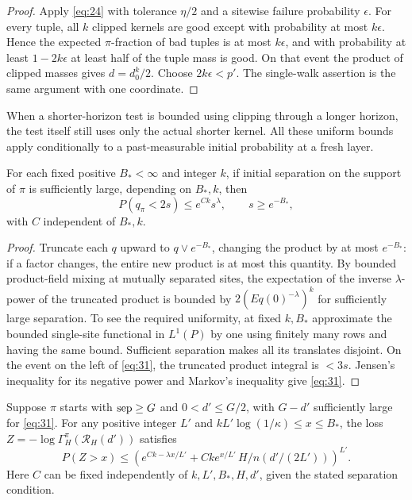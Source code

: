 \begin{proof}
Apply \eqref{eq:24} with tolerance \(\eta/2\) and a sitewise failure
probability \(\epsilon\). For every tuple, all \(k\) clipped kernels
are good except with probability at most \(k\epsilon\). Hence the
expected \(\pi\)-fraction of bad tuples is at most \(k\epsilon\), and
with probability at least \(1-2k\epsilon\) at least half of the tuple
mass is good. On that event the product of clipped masses gives
\(d=d_0^k/2\). Choose \(2k\epsilon<p'\). The single-walk assertion is
the same argument with one coordinate.
\end{proof}

When a shorter-horizon test is bounded using clipping through a longer
horizon, the test itself still uses only the actual shorter kernel.
All these uniform bounds apply conditionally to a past-measurable
initial probability at a fresh layer.

\begin{lemma}\label{kernel-inverse-moment}
For each fixed positive \(B_*<\infty\) and integer \(k\), if initial
separation on the support of \(\pi\) is sufficiently large, depending
on \(B_*,k\), then
\[
P(q_\pi<2s)\le e^{C k}s^\lambda,\qquad s\ge e^{-B_*},
\tag{31}\label{eq:31}
\]
with \(C\) independent of \(B_*,k\).
\end{lemma}

\begin{proof}
Truncate each \(q\) upward to \(q\vee e^{-B_*}\), changing the product
by at most \(e^{-B_*}\): if a factor changes, the entire new product is
at most this quantity. By bounded product-field mixing at mutually
separated sites, the expectation of the inverse \(\lambda\)-power of
the truncated product is bounded by \(2(Eq(0)^{-\lambda})^k\) for
sufficiently large separation. To see the required uniformity, at fixed
\(k,B_*\) approximate the bounded single-site functional in \(L^1(P)\)
by one using finitely many rows and having the same bound. Sufficient
separation makes all its translates disjoint. On the event on the left
of \eqref{eq:31}, the truncated product integral is \(<3s\). Jensen's
inequality for its negative power and Markov's inequality give
\eqref{eq:31}.
\end{proof}

\begin{proposition}\label{kernel-rapid-loss}
Suppose \(\pi\) starts with \({\rm sep}\ge G\) and \(0<d'\le G/2\), with \(G-d'\) sufficiently large for \eqref{eq:31}. For any positive integer \(L'\) and \(kL'\log(1/\kappa)\le x\le B_*\), the loss \(Z=-\log\Gamma_H^\pi(\mathcal R_H(d'))\) satisfies
\[
P(Z>x)\le
\left(e^{Ck-\lambda x/L'} + C k e^{x/L'}\,H/n(d'/(2L'))\right)^{L'}.
\tag{32}\label{eq:32}
\]
Here \(C\) can be fixed independently of \(k,L',B_*,H,d'\), given the
stated separation condition.
\end{proposition}

